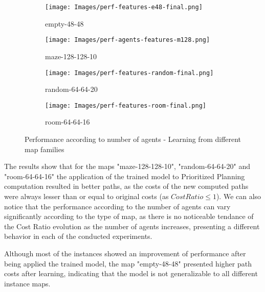 \begin{figure}[htbp]
    \centering
    \begin{subfigure}[b]{0.45\textwidth}
        \texttt{[image: Images/perf-features-e48-final.png]}
        \caption{empty-48-48}
        \label{fig:perf-empty-48-48}
    \end{subfigure}
    \hspace{0.01\textwidth}
    \begin{subfigure}[b]{0.45\textwidth}
        \texttt{[image: Images/perf-agents-features-m128.png]}
        \caption{maze-128-128-10}
        \label{fig:perf-maze-128-128-10}
    \end{subfigure}

    \vspace{0.5cm}

    \begin{subfigure}[b]{0.45\textwidth}
        \texttt{[image: Images/perf-features-random-final.png]}
        \caption{random-64-64-20}
        \label{fig:perf-random-64-64-20}
    \end{subfigure}
    \hspace{0.01\textwidth}
    \begin{subfigure}[b]{0.45\textwidth}
        \texttt{[image: Images/perf-features-room-final.png]}
        \caption{room-64-64-16}
        \label{fig:perf-room-64-64-16}
    \end{subfigure}
    
    \caption{Performance according to number of agents - Learning from different map families}
    \label{fig:perf-agents-8}
\end{figure}

The results show that for the maps "maze-128-128-10", "random-64-64-20" and "room-64-64-16" the application of the trained model to Prioritized Planning computation resulted in better paths, as the costs of the new computed paths were always lesser than or equal to original costs (as $Cost Ratio \leq 1$). We can also notice that the performance according to the number of agents can vary significantly according to the type of map, as there is no noticeable tendance of the Cost Ratio evolution as the number of agents increases, presenting a different behavior in each of the conducted experiments.

Although most of the instances showed an improvement of performance after being applied the trained model, the map "empty-48-48" presented higher path costs after learning, indicating that the model is not generalizable to all different instance maps. 


